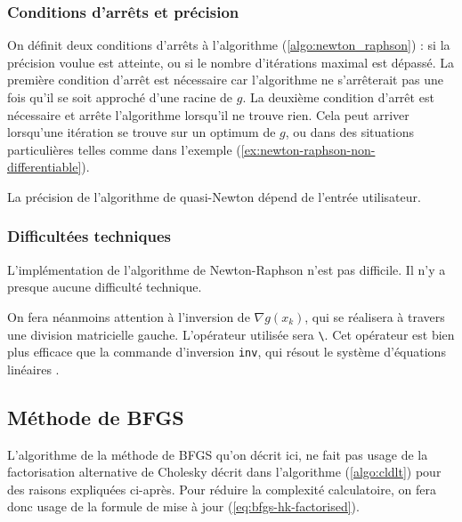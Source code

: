 \documentclass[3p, twocolumn]{elsarticle}
\begin{document}
\subsubsection{Conditions d'arrêts et précision}
On définit deux conditions d'arrêts à l'algorithme (\ref{algo:newton_raphson}) : si la précision voulue est atteinte, ou si le nombre d'itérations maximal est dépassé. La première condition d'arrêt est nécessaire car l'algorithme ne s'arrêterait pas une fois qu'il se soit approché d'une racine de $g$. La deuxième condition d'arrêt est nécessaire et arrête l'algorithme lorsqu'il ne trouve rien. Cela peut arriver lorsqu'une itération se trouve sur un optimum de $g$, ou dans des situations particulières telles comme dans l'exemple (\ref{ex:newton-raphson-non-differentiable}).

La précision de l'algorithme de quasi-Newton dépend de l'entrée utilisateur.

\subsubsection{Difficultées techniques}
L'implémentation de l'algorithme de Newton-Raphson n'est pas difficile. Il n'y a presque aucune difficulté technique.

On fera néanmoins attention à l'inversion de $\nabla g(x_k)$, qui se réalisera à travers une division matricielle gauche. L'opérateur utilisée sera \texttt{\textbackslash}. Cet opérateur est bien plus efficace que la commande d'inversion \texttt{inv}, qui résout le système d'équations linéaires \cite{doc:scilab-backslash}.

\subsection{Méthode de BFGS}
L'algorithme de la méthode de BFGS qu'on décrit ici, ne fait pas usage de la factorisation alternative de Cholesky décrit dans l'algorithme (\ref{algo:cldlt}) pour des raisons expliquées ci-après. Pour réduire la complexité calculatoire, on fera donc usage de la formule de mise à jour (\ref{eq:bfgs-hk-factorised}).
\end{document}
